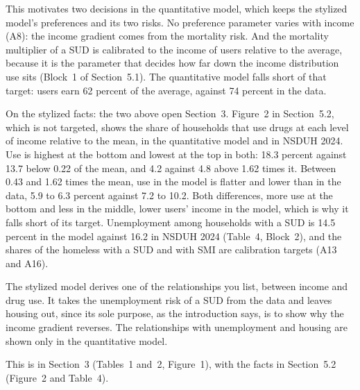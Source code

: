 \documentclass[11pt]{article}
\begin{document}
\begin{response}
This motivates two decisions in the quantitative model, which keeps the stylized
model's preferences and its two risks. No preference parameter varies with income
(A8): the income gradient comes from the mortality risk. And the mortality
multiplier of a SUD is calibrated to the income of users relative to the average,
because it is the parameter that decides how far down the income distribution use
sits (Block~1 of Section~5.1). The quantitative model falls short of that target:
users earn 62 percent of the average, against 74 percent in the data.

On the stylized facts: the two above open Section~3. Figure~2 in Section~5.2, which
is not targeted, shows the share of households that use drugs at each level of
income relative to the mean, in the quantitative model and in NSDUH 2024. Use is
highest at the bottom and lowest at the top in both: 18.3 percent against 13.7
below 0.22 of the mean, and 4.2 against 4.8 above 1.62 times it. Between 0.43 and
1.62 times the mean, use in the model is flatter and lower than in the data, 5.9 to
6.3 percent against 7.2 to 10.2. Both differences, more use at the bottom and less
in the middle, lower users' income in the model, which is why it falls short of its
target. Unemployment among households with a SUD is 14.5 percent in the model
against 16.2 in NSDUH 2024 (Table~4, Block~2), and the shares of the homeless with a
SUD and with SMI are calibration targets (A13 and A16).

\open The stylized model derives one of the relationships you list, between income
and drug use. It takes the unemployment risk of a SUD from the data and leaves
housing out, since its sole purpose, as the introduction says, is to show why the
income gradient reverses. The relationships with unemployment and housing are
shown only in the quantitative model.

This is in Section~3 (Tables~1 and~2, Figure~1), with the facts in Section~5.2
(Figure~2 and Table~4).
\end{response}
\end{document}
